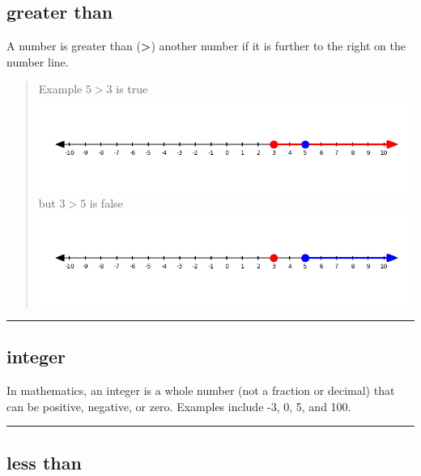 \documentclass[
  letterpaper,
]{scrrept}
\begin{document}
\subsection*{greater than}\label{glossary-greater-than}

A number is greater than (\textbf{\textgreater{}}) another number if it
is further to the right on the number line.

\begin{quote}
Example \(5 > 3\) is true
\includegraphics[width=1\linewidth,height=\textheight,keepaspectratio]{images/Glossary/greater_than_true.png}
but \(3 > 5\) is false
\includegraphics[width=1\linewidth,height=\textheight,keepaspectratio]{images/Glossary/greater_than_false.png}
\end{quote}

\begin{center}\rule{0.5\linewidth}{0.5pt}\end{center}

\subsection*{integer}\label{glossary-integer}

In mathematics, an integer is a whole number (not a fraction or decimal)
that can be positive, negative, or zero. Examples include -3, 0, 5, and
100.

\begin{center}\rule{0.5\linewidth}{0.5pt}\end{center}

\subsection*{less than}\label{glossary-less-than}
\end{document}
